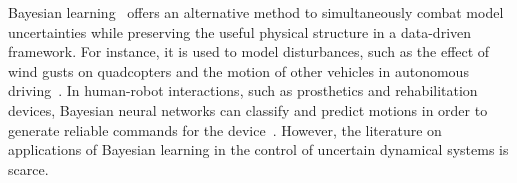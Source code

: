 

Bayesian learning~\cite{gal2016improving,thakur} offers an alternative method to
simultaneously combat model uncertainties while preserving the useful physical
structure in a data-driven framework.
%
%
For instance, it is used to model disturbances, such as the effect of wind gusts
on quadcopters and the motion of other vehicles in autonomous
driving~\cite{sadigh2015safe}. 
%
%
%
In human-robot interactions, such as prosthetics and rehabilitation devices,
Bayesian neural networks can classify and predict motions in order to generate
reliable commands for the device~\cite{motionclassification}. 
%
%
%
However, the literature on applications of Bayesian learning in the control of
uncertain dynamical systems is scarce.

